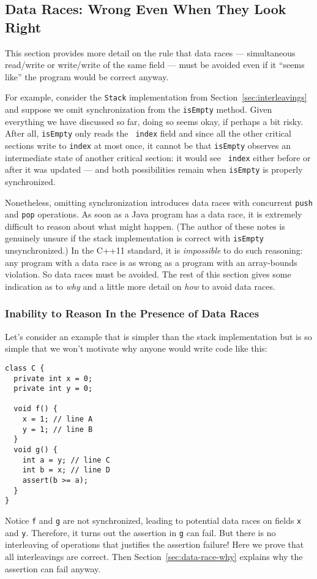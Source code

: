 \documentclass[10pt]{article}
\begin{document}
\subsection{Data Races: Wrong Even When They Look Right}
\label{sec:data-races}

This section provides more detail on the rule that data races ---
simultaneous read/write or write/write of the same field --- must be
avoided even if it ``seems like'' the program would be correct
anyway.  

For example, consider the {\tt Stack} implementation from Section~\ref{sec:interleavings}
and suppose we omit synchronization from the {\tt isEmpty} method.
Given everything we have discussed so far, doing so seems okay, if
perhaps a bit risky.  After all, {\tt isEmpty} only reads the {\tt
  index} field and since all the other critical sections write
to {\tt index} at most once, it cannot be that {\tt isEmpty} observes an
intermediate state of another critical section: it would see {\tt
  index} either before or after it was updated --- and both
possibilities remain when {\tt isEmpty} is properly synchronized.

Nonetheless, omitting synchronization introduces data races with
concurrent {\tt push} and {\tt pop} operations.  As soon as a Java
program has a data race, it is extremely difficult to reason about
what might happen.  (The author of these notes is genuinely unsure if
the stack implementation is correct with {\tt isEmpty}
unsynchronized.)  In the C++11 standard, it is
\emph{impossible} to do such reasoning: any program with a data race
is as wrong as a program with an array-bounds violation.  So data
races must be avoided.  The rest of this section gives some indication
as to \emph{why} and a little more detail on \emph{how} to avoid data
races.

\subsubsection{Inability to Reason In the Presence of Data Races}
\label{sec:data-race-example}

Let's consider an example that is simpler than the stack
implementation but is so simple that we won't motivate why anyone
would write code like this:
\begin{verbatim}
class C {
  private int x = 0;
  private int y = 0;

  void f() {
    x = 1; // line A
    y = 1; // line B
  }
  void g() {
    int a = y; // line C
    int b = x; // line D
    assert(b >= a);
  }   
}
\end{verbatim}
Notice {\tt f} and {\tt g} are not synchronized, leading to potential
data races on fields {\tt x} and {\tt y}.  Therefore, it turns out the
assertion in {\tt g} can fail.  But there is no interleaving of
operations that justifies the assertion failure!  Here we prove that
all interleavings are correct.  Then Section~\ref{sec:data-race-why}
explains why the assertion can fail anyway.
\end{document}

